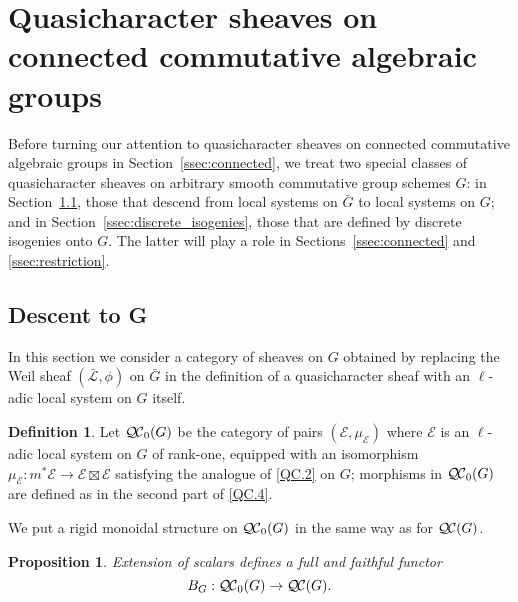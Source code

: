 \documentclass[10pt]{amsart}
\theoremstyle{plain}
\newtheorem{proposition}[theorem]{Proposition}
\theoremstyle{definition}
\newtheorem{definition}[theorem]{Definition}
\theoremstyle{remark}
\newcommand{\qcs}[1]{{\mathcal{#1}}}
\newcommand{\gqcs}[1]{{\mathcal{\bar #1}}}
\newcommand{\QC}{{\mathcal{Q\hskip-0.8pt C}}}
\newcommand{\bQC}{{\QC_0}}
\newcommand{\bG}{\bar{G}}
\begin{document}
\section{Quasicharacter sheaves on connected commutative algebraic groups} \label{sec:disc-isog}

Before turning our attention to quasicharacter sheaves on connected commutative algebraic groups in Section~\ref{ssec:connected}, we treat two special classes of quasicharacter sheaves on arbitrary smooth commutative group schemes $G$:  in Section~\ref{ssec:descentG}, those that descend from local systems on $\bG$ to local systems on $G$; and in Section~\ref{ssec:discrete_isogenies}, those that are defined by discrete isogenies onto $G$. The latter will play a role in Sections~\ref{ssec:connected} and \ref{ssec:restriction}.

\subsection{Descent to G}\label{ssec:descentG}

In this section we consider a category of sheaves on $G$ obtained by
replacing the Weil sheaf $(\gqcs{L}, \phi)$ on $\bG$ in the definition of a quasicharacter sheaf with an $\ell$-adic local system on $G$ itself.

\begin{definition}
Let $\bQC(G)$ be the category of pairs $(\qcs{E},\mu_\qcs{E})$
where $\qcs{E}$ is an $\ell$-adic local system on $G$ of rank-one,
equipped with an isomorphism $\mu_\qcs{E} : m^* \qcs{E} \to \qcs{E} \boxtimes \qcs{E}$
satisfying the analogue of \ref{QC.2} on $G$;
morphisms in $\bQC(G)$ are defined as in the second part of
\ref{QC.4}.
\end{definition}

We put a rigid monoidal structure on $\bQC(G)$ in the same way as for $\QC(G)$.

\begin{proposition}\label{prop:BG}
Extension of scalars defines a full and faithful functor
\[
B_G : \bQC(G) \to \QC(G).
\]
\end{proposition}
\end{document}

